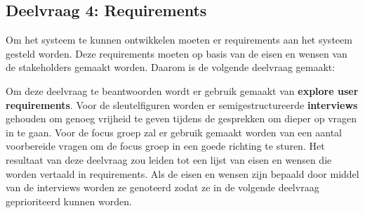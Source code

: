 \subsection{Deelvraag 4: Requirements}
Om het systeem te kunnen ontwikkelen moeten er requirements aan het systeem gesteld worden.
Deze requirements moeten op basis van de eisen en wensen van de stakeholders gemaakt worden.
Daarom is de volgende deelvraag gemaakt:

\begin{center}
 \textit{\SubquestionFour}
\end{center}

\whitespace[0.2]
Om deze deelvraag te beantwoorden wordt er gebruik gemaakt van \textbf{explore user requirements}.
Voor de sleutelfiguren worden er semigestructureerde \textbf{interviews} gehouden om genoeg vrijheid te geven tijdens de gesprekken om dieper op vragen in te gaan.
 Voor de focus groep zal er gebruik gemaakt worden van een aantal voorbereide vragen om de focus groep in een goede richting te sturen.
Het resultaat van deze deelvraag zou leiden tot een lijst van eisen en wensen die worden vertaald in requirements.
Als de eisen en wensen zijn bepaald door middel van de interviews worden ze genoteerd zodat ze in de volgende deelvraag geprioriteerd kunnen worden.
